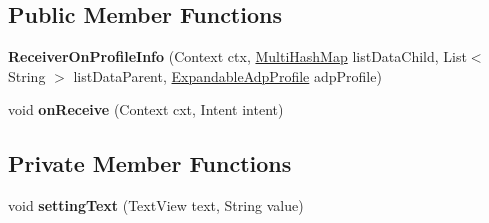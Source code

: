 \subsection*{Public Member Functions}
\begin{DoxyCompactItemize}
\item 
{\bfseries Receiver\+On\+Profile\+Info} (Context ctx, \hyperlink{classcom_1_1example_1_1sebastian_1_1tindertp_1_1commonTools_1_1MultiHashMap}{Multi\+Hash\+Map} list\+Data\+Child, List$<$ String $>$ list\+Data\+Parent, \hyperlink{classcom_1_1example_1_1sebastian_1_1tindertp_1_1ExpandableAdpProfile}{Expandable\+Adp\+Profile} adp\+Profile)\hypertarget{classcom_1_1example_1_1sebastian_1_1tindertp_1_1services_1_1ReceiverOnProfileInfo_aa676888bb81ca9b63aa72ac44be8a19a}{}\label{classcom_1_1example_1_1sebastian_1_1tindertp_1_1services_1_1ReceiverOnProfileInfo_aa676888bb81ca9b63aa72ac44be8a19a}

\item 
void {\bfseries on\+Receive} (Context cxt, Intent intent)\hypertarget{classcom_1_1example_1_1sebastian_1_1tindertp_1_1services_1_1ReceiverOnProfileInfo_a7c73d674602bc9119b9a84b238134107}{}\label{classcom_1_1example_1_1sebastian_1_1tindertp_1_1services_1_1ReceiverOnProfileInfo_a7c73d674602bc9119b9a84b238134107}

\end{DoxyCompactItemize}
\subsection*{Private Member Functions}
\begin{DoxyCompactItemize}
\item 
void {\bfseries setting\+Text} (Text\+View text, String value)\hypertarget{classcom_1_1example_1_1sebastian_1_1tindertp_1_1services_1_1ReceiverOnProfileInfo_ae54ede99c28efdfdc5cb83cb97a69845}{}\label{classcom_1_1example_1_1sebastian_1_1tindertp_1_1services_1_1ReceiverOnProfileInfo_ae54ede99c28efdfdc5cb83cb97a69845}

\end{DoxyCompactItemize}
